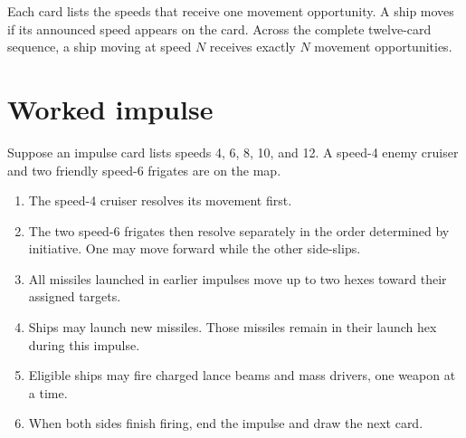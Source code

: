 Each card lists the speeds that receive one movement opportunity. A ship moves if its announced speed appears on the card. Across the complete twelve-card sequence, a ship moving at speed $N$ receives exactly $N$ movement opportunities.


\section{Worked impulse}

Suppose an impulse card lists speeds 4, 6, 8, 10, and 12. A speed-4 enemy cruiser and two friendly speed-6 frigates are on the map.

\begin{enumerate}
  \item The speed-4 cruiser resolves its movement first.
  \item The two speed-6 frigates then resolve separately in the order determined by initiative. One may move forward while the other side-slips.
  \item All missiles launched in earlier impulses move up to two hexes toward their assigned targets.
  \item Ships may launch new missiles. Those missiles remain in their launch hex during this impulse.
  \item Eligible ships may fire charged lance beams and mass drivers, one weapon at a time.
  \item When both sides finish firing, end the impulse and draw the next card.
\end{enumerate}
